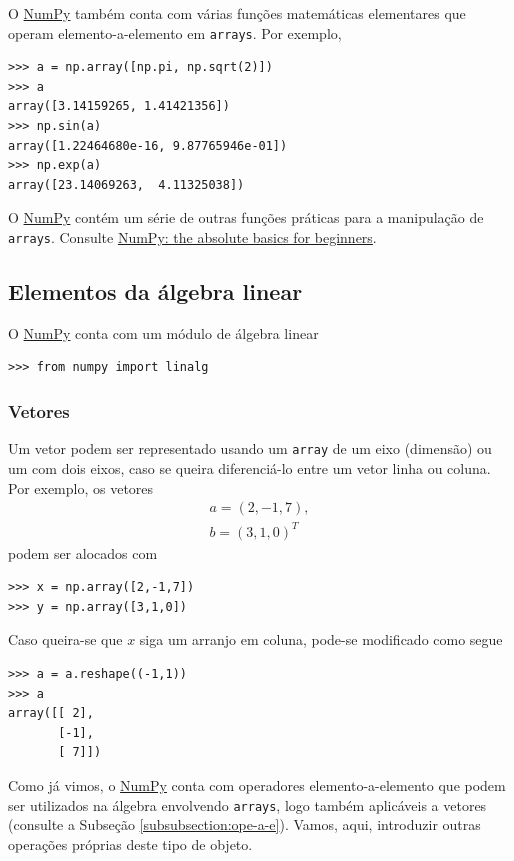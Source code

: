\documentclass[12pt]{article}
\begin{document}
O \href{https://numpy.org/}{NumPy} também conta com várias funções matemáticas elementares que operam elemento-a-elemento em \lstinline+arrays+. Por exemplo,
\begin{lstlisting}
>>> a = np.array([np.pi, np.sqrt(2)])
>>> a
array([3.14159265, 1.41421356])
>>> np.sin(a)
array([1.22464680e-16, 9.87765946e-01])
>>> np.exp(a)
array([23.14069263,  4.11325038])
\end{lstlisting}
 
\begin{obs}
O \href{https://numpy.org/}{NumPy} contém um série de outras funções práticas para a manipulação de \lstinline+arrays+. Consulte \href{https://numpy.org/doc/stable/user/absolute_beginners.html\#numpy-the-absolute-basics-for-beginners}{NumPy: the absolute basics for beginners}.  
\end{obs}

\subsection{Elementos da álgebra linear}

O \href{https://numpy.org/}{NumPy} conta com um módulo de álgebra linear
\begin{lstlisting}
>>> from numpy import linalg
\end{lstlisting}

\subsubsection{Vetores}

Um vetor podem ser representado usando um \lstinline+array+ de um eixo (dimensão) ou um com dois eixos, caso se queira diferenciá-lo entre um vetor linha ou coluna. Por exemplo, os vetores
\begin{gather}
  a = (2, -1, 7),\\
  b = (3, 1, 0)^T
\end{gather}
podem ser alocados com
\begin{lstlisting}
>>> x = np.array([2,-1,7])
>>> y = np.array([3,1,0])
\end{lstlisting}
Caso queira-se que $x$ siga um arranjo em coluna, pode-se modificado como segue
\begin{lstlisting}
>>> a = a.reshape((-1,1))
>>> a
array([[ 2],
       [-1],
       [ 7]])
\end{lstlisting}

Como já vimos, o \href{https://numpy.org/}{NumPy} conta com operadores elemento-a-elemento que podem ser utilizados na álgebra envolvendo \lstinline+arrays+, logo também aplicáveis a vetores (consulte a Subseção \ref{subsubsection:ope-a-e}). Vamos, aqui, introduzir outras operações próprias deste tipo de objeto.
\end{document}
